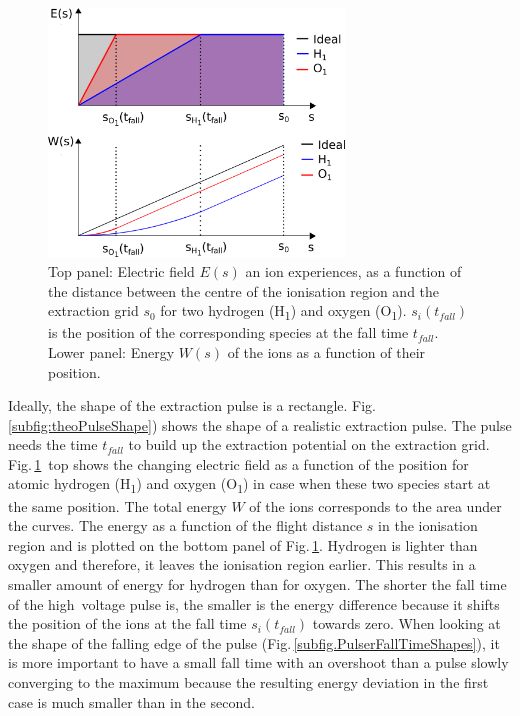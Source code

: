 	\begin{figure}[h] %
		\centering
		\includegraphics[width= 0.7\textwidth]{Bilder/PulsInt.png}
		\caption{Top panel: Electric field $E(s)$ an ion experiences, as a function of the distance between the centre of the ionisation region and the extraction grid $s_0$ for two hydrogen (H\textsubscript{1}) and oxygen (O\textsubscript{1}). $s_i(t_{fall})$ is the position of the corresponding species at the fall time $t_{fall}$. Lower panel: Energy $W(s)$ of the ions as a function of their position.}
		\label{fig:PulsInt}
	\end{figure}
	
	Ideally, the shape of the extraction pulse is a rectangle. Fig.\,\ref{subfig:theoPulseShape}) shows the shape of a realistic extraction pulse. The pulse needs the time $t_{fall}$ to build up the extraction potential on the extraction grid. Fig.\,\ref{fig:PulsInt}~top shows the changing electric field as a function of the position for atomic hydrogen (H\textsubscript{1}) and oxygen (O\textsubscript{1}) in case when these two species start at the same position. The total energy $W$ of the ions corresponds to the area under the curves. The energy as a function of the flight distance $s$ in the ionisation region and is plotted on the bottom panel of Fig.\,\ref{fig:PulsInt}. Hydrogen is lighter than oxygen and therefore, it leaves the ionisation region earlier. This results in a smaller amount of energy for hydrogen than for oxygen. The shorter the fall time of the high~voltage pulse is, the smaller is the energy difference because it shifts the position of the ions at the fall time $s_i(t_{fall})$ towards zero. When looking at the shape of the falling edge of the pulse (Fig.\,\ref{subfig.PulserFallTimeShapes}), it is more important to have a small fall time with an overshoot than a pulse slowly converging to the maximum because the resulting energy deviation in the first case is much smaller than in the second.\\
	
